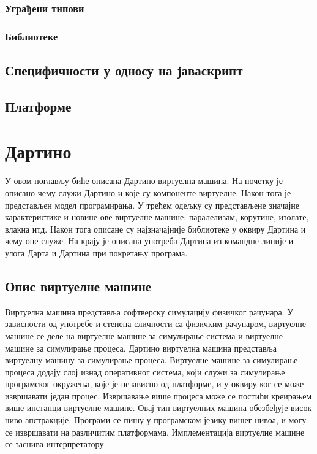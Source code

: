 \documentclass[12pt,oneside]{memoir}
\begin{document}
\subsection{Уграђени типови}

\subsection{Библиотеке}

\section{Специфичности у односу на јаваскрипт}

\section{Платформе}


\chapter{Дартино}
\label{chp:dartino}
У овом поглављу биће описана Дартино виртуелна машина. На почетку је описано чему служи Дартино и које су компоненте виртуелне. Након тога је представљен модел програмирања. У трећем одељку су представљене значајне карактеристике и новине ове виртуелне машине: паралелизам, корутине, изолате, влакна итд. Након тога описане су најзначајније библиотеке у оквиру Дартина и чему оне служе. На крају је описана употреба Дартина из командне линије и улога Дарта и Дартина при покретању програма.
\section{Опис виртуелне машине}

Виртуелна машина представља софтверску симулацију физичког рачунара. У зависности од употребе и степена сличности са физичким рачунаром, виртуелне машине се деле на виртуелне машине за симулирање система и виртуелне машине за симулирање процеса.
Дартино виртуелна машина представља виртуелну машину за симулирање процеса. Виртуелне машине за симулирање процеса додају слој изнад оперативног система, који служи за симулирање програмског окружења, које је независно од платформе, и у оквиру ког се може извршавати један процес. Извршавање више процеса може се постићи креирањем више инстанци виртуелне машине. Овај тип виртуелних машина обезбеђује висок ниво апстракције. Програми се пишу у програмском језику вишег нивоа, и могу се извршавати на различитим платформама. Имплементација виртуелне машине се заснива интерпретатору.
\end{document}
